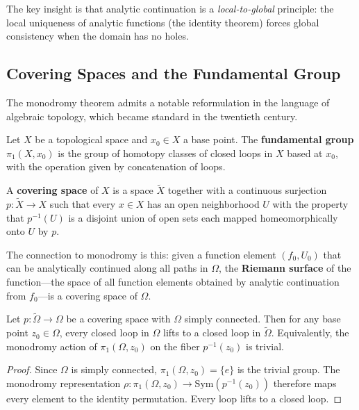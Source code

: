 The key insight is that analytic continuation is a \emph{local-to-global} principle: the local uniqueness of analytic functions (the identity theorem) forces global consistency when the domain has no holes.

\subsection{Covering Spaces and the Fundamental Group}

The monodromy theorem admits a notable reformulation in the language of algebraic topology, which became standard in the twentieth century.

\begin{definition}
Let $X$ be a topological space and $x_0 \in X$ a base point. The \textbf{fundamental group} $\pi_1(X, x_0)$ is the group of homotopy classes of closed loops in $X$ based at $x_0$, with the operation given by concatenation of loops.
\end{definition}

\begin{definition}
A \textbf{covering space} of $X$ is a space $\tilde{X}$ together with a continuous surjection $p \colon \tilde{X} \to X$ such that every $x \in X$ has an open neighborhood $U$ with the property that $p^{-1}(U)$ is a disjoint union of open sets each mapped homeomorphically onto $U$ by $p$.
\end{definition}

The connection to monodromy is this: given a function element $(f_0, U_0)$ that can be analytically continued along all paths in $\Omega$, the \textbf{Riemann surface} of the function---the space of all function elements obtained by analytic continuation from $f_0$---is a covering space of $\Omega$.

\begin{theorem}
\label{thm:monodromy-topological}
Let $p \colon \tilde{\Omega} \to \Omega$ be a covering space with $\Omega$ simply connected. Then for any base point $z_0 \in \Omega$, every closed loop in $\Omega$ lifts to a closed loop in $\tilde{\Omega}$. Equivalently, the monodromy action of $\pi_1(\Omega, z_0)$ on the fiber $p^{-1}(z_0)$ is trivial.
\end{theorem}

\begin{proof}
Since $\Omega$ is simply connected, $\pi_1(\Omega, z_0) = \{e\}$ is the trivial group. The monodromy representation $\rho \colon \pi_1(\Omega, z_0) \to \mathrm{Sym}(p^{-1}(z_0))$ therefore maps every element to the identity permutation. Every loop lifts to a closed loop.
\end{proof}


